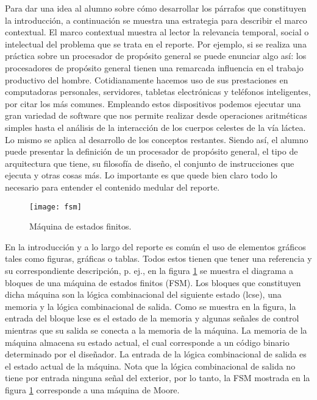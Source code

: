 \documentclass[11pt, twocolumn]{article}
\begin{document}
Para dar una idea al alumno sobre cómo desarrollar los párrafos que constituyen la introducción, a continuación se muestra una estrategia para describir el marco contextual. El marco contextual muestra al lector la relevancia temporal, social o intelectual del problema que se trata en el reporte. Por ejemplo, si se realiza una práctica sobre un procesador de propósito general se puede enunciar algo así: los procesadores de propósito general tienen una remarcada influencia en el trabajo productivo del hombre. Cotidianamente hacemos uso de sus prestaciones en computadoras personales, servidores, tabletas electrónicas y teléfonos inteligentes, por citar los más comunes. Empleando estos dispositivos podemos ejecutar una gran variedad de software que nos permite realizar desde operaciones aritméticas simples hasta el análisis de la interacción de los cuerpos celestes de la vía láctea. Lo mismo se aplica al desarrollo de los conceptos restantes. Siendo así, el alumno puede presentar la definición de un procesador de propósito general, el tipo de arquitectura que tiene, su filosofía de diseño, el conjunto de instrucciones que ejecuta y otras cosas más. Lo importante es que quede bien claro todo lo necesario para entender el contenido medular del reporte.

\begin{figure}[t] %
    \centering
    \texttt{[image: fsm]}
    \caption{Máquina de estados finitos.}
    \label{fig:fsm}
\end{figure}

En la introducción y a lo largo del reporte es común el uso de elementos gráficos tales como figuras, gráficas o tablas. Todos estos tienen que tener una referencia y su correspondiente descripción, p. ej., en la figura \ref{fig:fsm} se muestra el diagrama a bloques de una máquina de estados finitos (FSM). Los bloques que constituyen dicha máquina son la lógica combinacional del siguiente estado (lcse), una memoria y la lógica combinacional de salida. Como se muestra en la figura, la entrada del bloque lcse es el estado de la memoria y algunas señales de control mientras que su salida se conecta a la memoria de la máquina. La memoria de la máquina almacena su estado actual, el cual corresponde a un código binario determinado por el diseñador. La entrada de la lógica combinacional de salida es el estado actual de la máquina. Nota que la lógica combinacional de salida no tiene por entrada ninguna señal del exterior, por lo tanto, la FSM mostrada en la figura \ref{fig:fsm} corresponde a una máquina de Moore.
\end{document}
